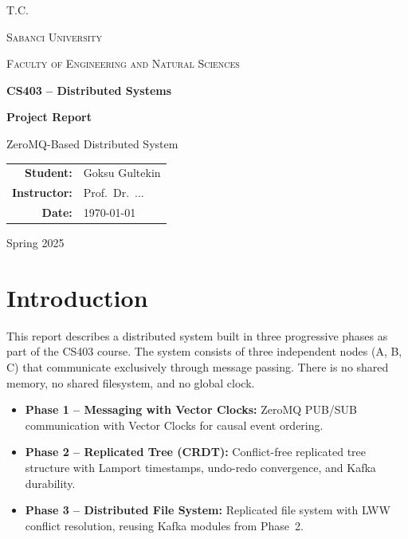 \documentclass[12pt, a4paper]{article}
\begin{document}
\begin{titlepage}
    \centering
    \vspace*{2cm}
    {\Large\textsc{T.C.}\par}
    \vspace{0.3cm}
    {\Large\textsc{Sabanci University}\par}
    {\large\textsc{Faculty of Engineering and Natural Sciences}\par}
    \vspace{2cm}
    {\LARGE\bfseries CS403 -- Distributed Systems\par}
    \vspace{0.5cm}
    {\Large\bfseries Project Report\par}
    \vspace{1cm}
    {\Large ZeroMQ-Based Distributed System\par}
    \vspace{2cm}
    \begin{tabular}{rl}
        \textbf{Student:}    & Goksu Gultekin \\
        \textbf{Instructor:} & Prof.\ Dr.\ ... \\
        \textbf{Date:}       & \today \\
    \end{tabular}
    \vfill
    {\small Spring 2025}
\end{titlepage}

\newpage

\section{Introduction}

This report describes a distributed system built in three progressive phases as part of the CS403 course. The system consists of three independent nodes (A, B, C) that communicate exclusively through message passing. There is no shared memory, no shared filesystem, and no global clock.

\begin{itemize}
    \item \textbf{Phase 1 -- Messaging with Vector Clocks:} ZeroMQ PUB/SUB communication with Vector Clocks for causal event ordering.
    \item \textbf{Phase 2 -- Replicated Tree (CRDT):} Conflict-free replicated tree structure with Lamport timestamps, undo-redo convergence, and Kafka durability.
    \item \textbf{Phase 3 -- Distributed File System:} Replicated file system with LWW conflict resolution, reusing Kafka modules from Phase~2.
\end{itemize}
\end{document}
